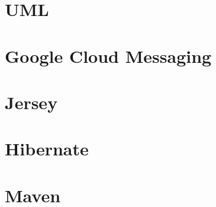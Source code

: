 	\section{UML}
		
	
	\section{Google Cloud 	Messaging}
		
	
	\section{Jersey}
		
	
	\section{Hibernate}
		
		
	\section{Maven}
		

%
%
	



				





